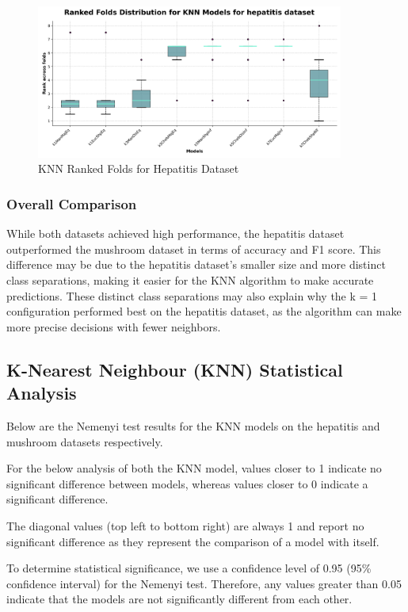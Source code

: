 \begin{figure}
    \centering
    \includegraphics[width=0.9\textwidth]{figures/ranked_folds_KNN_hepatitis.png}
    \caption{KNN Ranked Folds for Hepatitis Dataset}
    \label{fig:ranked_folds_KNN_hepatitis}
\end{figure}

\subsubsection{Overall Comparison}
While both datasets achieved high performance, the hepatitis dataset outperformed the mushroom dataset in terms of accuracy and F1 score.
This difference may be due to the hepatitis dataset's smaller size and more distinct class separations,
making it easier for the KNN algorithm to make accurate predictions. These distinct class separations may also explain why the k = 1 configuration
performed best on the hepatitis dataset, as the algorithm can make more precise decisions with fewer neighbors.

\subsection*{K-Nearest Neighbour (KNN) Statistical Analysis}
Below are the Nemenyi test results for the KNN models on the hepatitis and mushroom datasets respectively.

For the below analysis of both the KNN model, values closer to 1 indicate no significant difference between models,
whereas values closer to 0 indicate a significant difference.

The diagonal values (top left to bottom right) are always 1 and report no significant difference
as they represent the comparison of a model with itself.

To determine statistical significance, we use a confidence level of 0.95 (95\% confidence interval) for the Nemenyi test.
Therefore, any values greater than 0.05 indicate that the models are not significantly different from each other.

